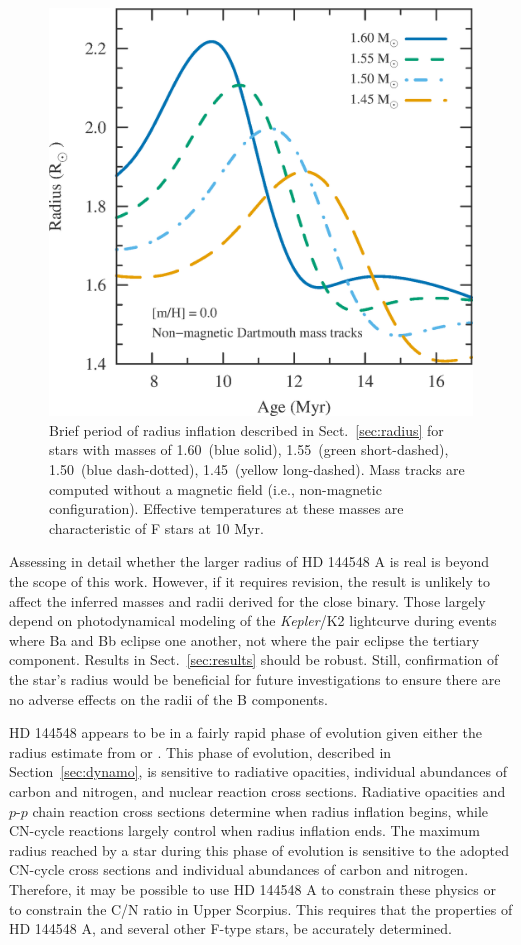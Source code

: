 \documentclass{aa}
\begin{document}
\begin{figure}
    \centering
    \includegraphics[width=0.85\linewidth]{radius_bump.eps}
    \caption{Brief period of radius inflation described in Sect.~\ref{sec:radius} for stars with masses of 1.60\msun\ (blue solid), 1.55\msun\ (green short-dashed), 1.50\msun\ (blue dash-dotted), 1.45\msun\ (yellow long-dashed). Mass tracks are computed without a magnetic field (i.e., non-magnetic configuration). Effective temperatures at these masses are characteristic of F stars at 10 Myr.}
    \label{fig:bump}
\end{figure}

Assessing in detail whether the larger radius of HD 144548 A is real is beyond the scope of this work. However, if it requires revision, the result is unlikely to affect the inferred masses and radii derived for the close binary. Those largely depend on photodynamical modeling of the \emph{Kepler}/K2 lightcurve during events where Ba and Bb eclipse one another, not where the pair eclipse the tertiary component. Results in Sect.~\ref{sec:results} should be robust. Still, confirmation of the star's radius would be beneficial for future investigations to ensure there are no adverse effects on the radii of the B components. 

HD 144548 appears to be in a fairly rapid phase of evolution given either the radius estimate from \cite{Pecaut2012} or \citet{Alonso2015}. This phase of evolution, described in Section~\ref{sec:dynamo}, is sensitive to radiative opacities, individual abundances of carbon and nitrogen, and nuclear reaction cross sections. Radiative opacities and $p$-$p$ chain reaction cross sections determine when radius inflation begins, while CN-cycle reactions largely control when radius inflation ends. The maximum radius reached by a star during this phase of evolution is sensitive to the adopted CN-cycle cross sections and individual abundances of carbon and nitrogen. Therefore, it may be possible to use HD 144548 A to constrain these physics or to constrain the C/N ratio in Upper Scorpius. This requires that the properties of HD 144548 A, and several other F-type stars, be accurately determined.
\end{document}
